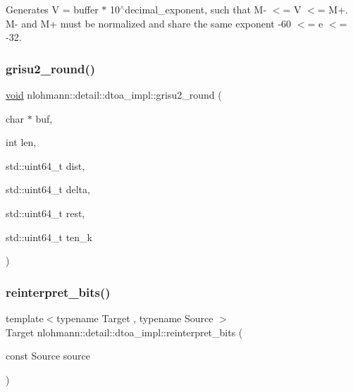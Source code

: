 Generates V = buffer $\ast$ 10$^\wedge$decimal\+\_\+exponent, such that M-\/ $<$= V $<$= M+. M-\/ and M+ must be normalized and share the same exponent -\/60 $<$= e $<$= -\/32. \mbox{\label{namespacenlohmann_1_1detail_1_1dtoa__impl_a5bc841e0bee12fd6489d49cf7bd07bb4}} 
\subsubsection{\texorpdfstring{grisu2\_round()}{grisu2\_round()}}
{\footnotesize\ttfamily \mbox{\hyperlink{namespacenlohmann_1_1detail_a59fca69799f6b9e366710cb9043aa77d}{void}} nlohmann\+::detail\+::dtoa\+\_\+impl\+::grisu2\+\_\+round (\begin{DoxyParamCaption}\item[{char $\ast$}]{buf,  }\item[{int}]{len,  }\item[{std\+::uint64\+\_\+t}]{dist,  }\item[{std\+::uint64\+\_\+t}]{delta,  }\item[{std\+::uint64\+\_\+t}]{rest,  }\item[{std\+::uint64\+\_\+t}]{ten\+\_\+k }\end{DoxyParamCaption})\hspace{0.3cm}{\ttfamily [inline]}}

\mbox{\label{namespacenlohmann_1_1detail_1_1dtoa__impl_a1c5d30eb51e5e994a3f48bde104d2ce8}} 
\subsubsection{\texorpdfstring{reinterpret\_bits()}{reinterpret\_bits()}}
{\footnotesize\ttfamily template$<$typename Target , typename Source $>$ \\
Target nlohmann\+::detail\+::dtoa\+\_\+impl\+::reinterpret\+\_\+bits (\begin{DoxyParamCaption}\item[{const Source}]{source }\end{DoxyParamCaption})}



